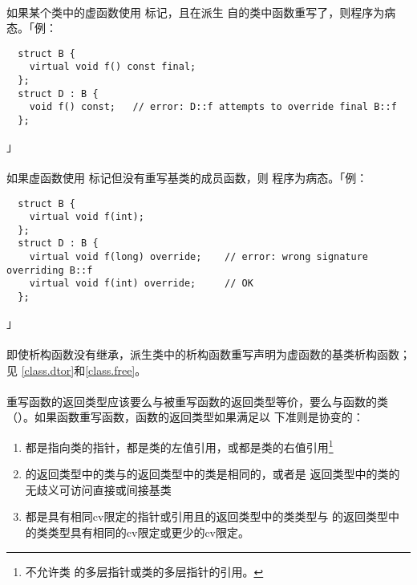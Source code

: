 \paragraph{}
如果某个类中的虚函数使用 标记，且在派生
自的类中函数重写了，则程序为病态。「例：
\begin{lstlisting}
  struct B {
    virtual void f() const final;
  };
  struct D : B {
    void f() const;   // error: D::f attempts to override final B::f
  };
\end{lstlisting}」

\paragraph{}
如果虚函数使用 标记但没有重写基类的成员函数，则
程序为病态。「例：
\begin{lstlisting}
  struct B {
    virtual void f(int);
  };
  struct D : B {
    virtual void f(long) override;    // error: wrong signature overriding B::f
    virtual void f(int) override;     // OK
  };
\end{lstlisting}」

\paragraph{}
即使析构函数没有继承，派生类中的析构函数重写声明为虚函数的基类析构函数；见
\ref{class.dtor}和\ref{class.free}。

\paragraph{}
重写函数的返回类型应该要么与被重写函数的返回类型等价，要么与函数的类
（）。如果函数重写函数，函数的返回类型如果满足以
下准则是协变的：
\begin{enumerate}
  \item{都是指向类的指针，都是类的左值引用，或都是类的右值引用\footnote{不允许类
    的多层指针或类的多层指针的引用。}}
  \item{的返回类型中的类与的返回类型中的类是相同的，或者是
    返回类型中的类的无歧义可访问直接或间接基类}
  \item{都是具有相同cv限定的指针或引用且的返回类型中的类类型与
    的返回类型中的类类型具有相同的cv限定或更少的cv限定。}
\end{enumerate}

